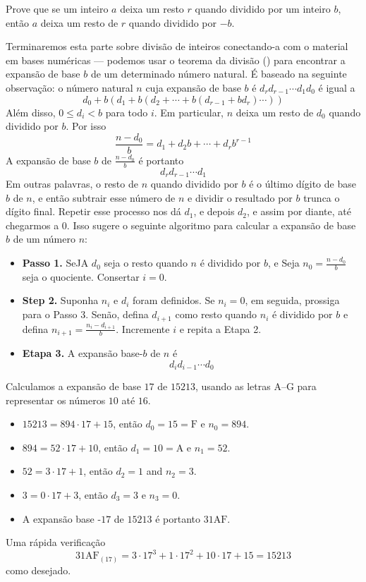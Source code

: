 \begin{exercise}
Prove que se um inteiro $a$ deixa um resto $r$ quando dividido por um inteiro $b$, então $a$ deixa um resto de $r$ quando dividido por $-b$.
\end{exercise}

Terminaremos esta parte sobre divisão de inteiros conectando-a com o material em bases numéricas --- podemos usar o teorema da divisão () para encontrar a expansão de base $b$ de um determinado número natural. É baseado na seguinte observação: o número natural $n$ cuja expansão de base $b$ é $d_rd_{r-1} \cdots d_1 d_0$ é igual a
\[ d_0 + b(d_1 + b(d_2 + \cdots + b(d_{r-1} + bd_r) \cdots)) \]
Além disso, $0 \le d_i < b$ para todo $i$. Em particular, $n$ deixa um resto de $d_0$ quando dividido por $b$. Por isso
\[ \frac{n-d_0}{b} = d_1 + d_2b + \cdots + d_rb^{r-1} \]
A expansão de base $b$ de $\frac{n-d_0}{b}$ é portanto
\[ d_rd_{r-1} \cdots d_1 \]
Em outras palavras, o resto de $n$ quando dividido por $b$ é o último dígito de base $b$ de $n$, e então subtrair esse número de $n$ e dividir o resultado por $b$ trunca o dígito final. Repetir esse processo nos dá $d_1$, e depois $d_2$, e assim por diante, até chegarmos a $0$.
Isso sugere o seguinte algoritmo para calcular a expansão de base $b$ de um número $n$:
\begin{itemize}
\item \textbf{Passo 1.} SeJA $d_0$ seja o resto quando $n$ é dividido por $b$, e Seja $n_0=\frac{n-d_0}{b}$ seja o quociente. Consertar $i=0$.
\item \textbf{Step 2.} Suponha $n_i$ e $d_i$ foram definidos. Se $n_i=0$, em seguida, prossiga para o Passo 3. Senão, defina $d_{i+1}$ como resto quando $n_i$ é dividido por $b$ e defina $n_{i+1} = \frac{n_i-d_{i+1}}{b}$. Incremente $i$ e repita a Etapa 2.
\item \textbf{Etapa 3.} A expansão base-$b$ de $n$ é
\[ d_id_{i-1} \cdots d_0 \]
\end{itemize}

\begin{example}
Calculamos a expansão de base $17$ de $15213$, usando as letras $\mathrm{A}$--$\mathrm{G}$ para representar os números $10$ até $16$.
\begin{itemize}
\item $15213 = 894 \cdot 17 + 15$, então $d_0=15=\mathrm{F}$ e $n_0=894$.
\item $894 = 52 \cdot 17 + 10$, então $d_1=10 = \mathrm{A}$ e $n_1=52$.
\item $52 = 3 \cdot 17 + 1$, então $d_2 = 1$ and $n_2=3$.
\item $3 = 0 \cdot 17 + 3$, então $d_3 = 3$ e $n_3=0$.
\item A expansão base -$17$ de $15213$ é portanto $31\mathrm{AF}$.
\end{itemize}
Uma rápida verificação
\[ 31\mathrm{AF}_{(17)} = 3 \cdot 17^3 + 1 \cdot 17^2 + 10 \cdot 17 + 15 = 15213 \]
como desejado.
\end{example}

